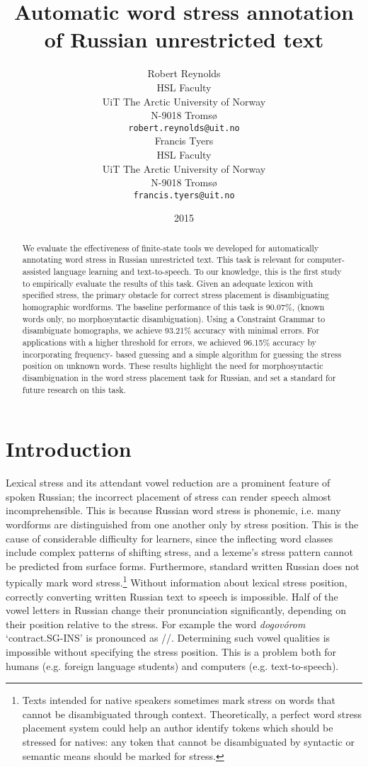\documentclass[11pt]{article}
\title{Automatic word stress annotation of Russian unrestricted text}
\author{Robert Reynolds\\
  HSL Faculty\\
  UiT The Arctic University of Norway\\
  N-9018 Troms\o\\
  {\tt robert.reynolds@uit.no} \\\And
  Francis Tyers \\
  HSL Faculty\\
  UiT The Arctic University of Norway\\
  N-9018 Troms\o\\
  {\tt francis.tyers@uit.no} \\}
\date{2015}
\newcommand{\rr}[1]{\marginpar{\scriptsize R: #1}} %
\begin{document}
\maketitle
\begin{abstract}
  We evaluate the effectiveness of finite-state tools we developed for 
  automatically annotating word stress in Russian unrestricted text. This task is
  relevant for computer-assisted language learning and text-to-speech. To our 
  knowledge, this is the first study to empirically evaluate the results of this 
  task. Given an adequate lexicon with specified stress, the primary obstacle for 
  correct stress placement is disambiguating homographic wordforms. The baseline
  performance of this task is 90.07\%, (known words only, no morphosyntactic 
  disambiguation). Using a Constraint Grammar to disambiguate homographs, we 
  achieve 93.21\% accuracy with minimal errors. For applications with a higher 
  threshold for errors, we achieved 96.15\% accuracy by incorporating frequency-
  based guessing and a simple algorithm for guessing the stress position on 
  unknown words. These results highlight the need for morphosyntactic 
  disambiguation in the word stress placement task for Russian, and set a standard 
  for future research on this task.
\end{abstract}
\rr{language learning?}

\section{Introduction}

Lexical stress and its attendant vowel reduction are a prominent feature of 
spoken Russian; the incorrect placement of stress can render speech almost 
incomprehensible. This is because Russian word stress is phonemic, i.e. many 
wordforms are distinguished from one another only by stress position. 
This is the cause of considerable difficulty for learners, since 
the inflecting word classes include 
complex patterns of shifting stress, and a lexeme's stress pattern cannot be 
predicted from surface forms. Furthermore, standard written Russian does not 
typically mark word stress.\footnote{Texts intended for native speakers sometimes 
mark stress on words that cannot be disambiguated through context. Theoretically, 
a perfect word stress placement system could help an author identify
tokens which should be stressed for natives: any token that cannot
be disambiguated by syntactic or semantic means should be marked for stress.} 
Without information about lexical stress position, 
correctly converting written Russian text to speech is impossible. Half of the
vowel letters in Russian change their pronunciation significantly, depending on
their position relative to the stress. For example the word \emph{dogovórom}
`contract.SG-INS' is pronounced as //. Determining such vowel
qualities is impossible without specifying the stress position. This is a problem 
both for humans (e.g. foreign language students) and computers (e.g. 
text-to-speech).
\end{document}
